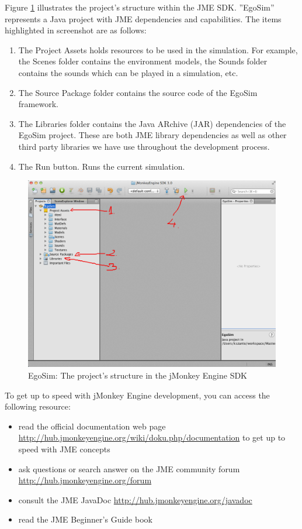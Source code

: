 Figure \ref{fig:egosim_structure} illustrates the project's structure within the JME SDK. ''EgoSim'' represents a Java project with JME dependencies and capabilities. The items highlighted in screenshot are as follows:
\begin{enumerate}
	\item The Project Assets holds resources to be used in the simulation. For example, the Scenes folder contains the environment models, the Sounds folder contains the sounds which can be played in a simulation, etc.
	\item The Source Package folder contains the source code of the EgoSim framework.
	\item The Libraries folder contains the Java ARchive (JAR) dependencies of the EgoSim project. These are both JME library dependencies as well as other third party libraries we have use throughout the development process.
	\item The Run button. Runs the current simulation.
\end{enumerate}

\begin{figure}[H]
	\centering
	\includegraphics[width=\linewidth]{gfx/Chapter4/project_structure_in_sdk}
	\caption{EgoSim: The project's structure in the jMonkey Engine SDK}
	\label{fig:egosim_structure}
\end{figure}

To get up to speed with jMonkey Engine development, you can access the following resource:
\begin{itemize}
	\item read the official documentation web page \url{http://hub.jmonkeyengine.org/wiki/doku.php/documentation} to get up to speed with JME concepts
	\item ask questions or search answer on the JME community forum \url{http://hub.jmonkeyengine.org/forum}
	\item consult the JME JavaDoc \url{http://hub.jmonkeyengine.org/javadoc}
	\item read the JME Beginner's Guide book \cite{kusterer2013jmonkeyengine}
\end{itemize}

